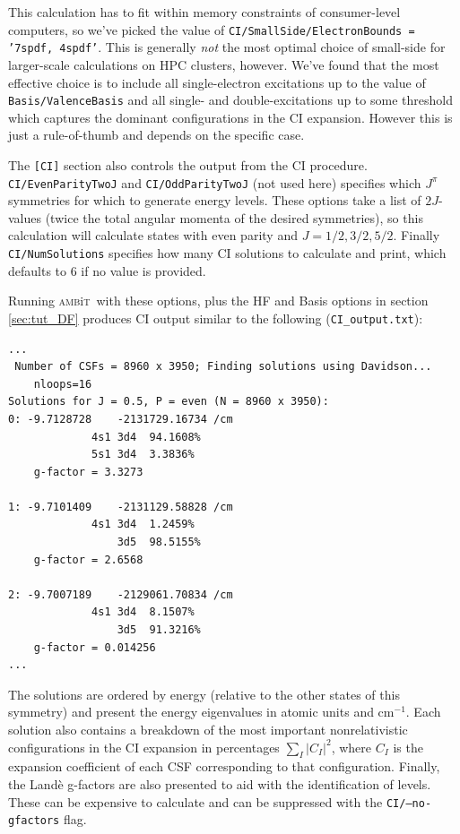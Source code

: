 \documentclass{report}
\newcommand{\ambit}{\textsc{amb}{\footnotesize i}\textsc{t}}
\newcommand{\cm}{cm$^{-1}$}
\begin{document}
This calculation has to fit within memory constraints of consumer-level computers, so we've picked the
value of \texttt{CI/SmallSide/ElectronBounds = '7spdf, 4spdf'}. This is generally \emph{not} the most optimal choice of
small-side for larger-scale calculations on HPC clusters, however. We've found that the most effective
choice is to include all single-electron excitations up to the value of \texttt{Basis/ValenceBasis} and
all single- and double-excitations up to some threshold which captures the dominant configurations in the CI expansion. However this is just a rule-of-thumb and depends on the specific case.

The \texttt{[CI]} section also controls the output from the CI procedure. \texttt{CI/EvenParityTwoJ} and
\texttt{CI/OddParityTwoJ} (not used here) specifies which $J^{\pi}$ symmetries for which to generate 
energy levels. These options take a list of $2J$-values (twice the total angular momenta of the desired
symmetries), so this calculation will calculate states with even parity and $J = 1/2, 3/2, 5/2$. Finally
\texttt{CI/NumSolutions} specifies how many CI solutions to calculate and print, which defaults to 6 if
no value is provided.

Running \ambit\  with these options, plus the HF and Basis options in section \ref{sec:tut_DF} produces
CI output similar to the following (\texttt{CI\_output.txt}):

\begin{verbatim}
...
 Number of CSFs = 8960 x 3950; Finding solutions using Davidson...
    nloops=16
Solutions for J = 0.5, P = even (N = 8960 x 3950):
0: -9.7128728    -2131729.16734 /cm
             4s1 3d4  94.1608%
             5s1 3d4  3.3836%
    g-factor = 3.3273

1: -9.7101409    -2131129.58828 /cm
             4s1 3d4  1.2459%
                 3d5  98.5155%
    g-factor = 2.6568

2: -9.7007189    -2129061.70834 /cm
             4s1 3d4  8.1507%
                 3d5  91.3216%
    g-factor = 0.014256
...
\end{verbatim}

The solutions are ordered by energy (relative to the other states of this
symmetry) and present the energy eigenvalues in atomic units and \cm.
Each solution also contains a breakdown of the most important nonrelativistic configurations in the CI
expansion in percentages $\displaystyle \sum_I |C_I|^2$, where $C_I$ is the expansion coefficient of
each CSF corresponding to that configuration. Finally, the Land\`{e} g-factors are also presented to aid
with the identification of levels. These can be expensive to calculate and can be suppressed with the
\texttt{CI/--no-gfactors} flag.
\end{document}
